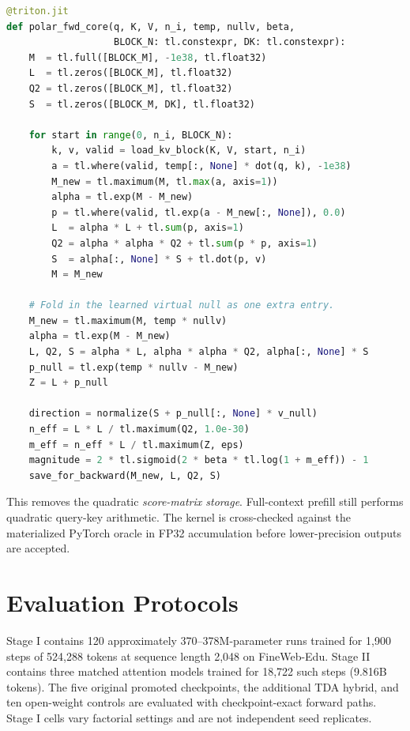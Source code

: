 \begin{lstlisting}[language=Python,caption={Schematic core of the block-streamed Triton forward pass.},label={lst:polar_triton}]
@triton.jit
def polar_fwd_core(q, K, V, n_i, temp, nullv, beta,
                   BLOCK_N: tl.constexpr, DK: tl.constexpr):
    M  = tl.full([BLOCK_M], -1e38, tl.float32)
    L  = tl.zeros([BLOCK_M], tl.float32)
    Q2 = tl.zeros([BLOCK_M], tl.float32)
    S  = tl.zeros([BLOCK_M, DK], tl.float32)

    for start in range(0, n_i, BLOCK_N):
        k, v, valid = load_kv_block(K, V, start, n_i)
        a = tl.where(valid, temp[:, None] * dot(q, k), -1e38)
        M_new = tl.maximum(M, tl.max(a, axis=1))
        alpha = tl.exp(M - M_new)
        p = tl.where(valid, tl.exp(a - M_new[:, None]), 0.0)
        L  = alpha * L + tl.sum(p, axis=1)
        Q2 = alpha * alpha * Q2 + tl.sum(p * p, axis=1)
        S  = alpha[:, None] * S + tl.dot(p, v)
        M = M_new

    # Fold in the learned virtual null as one extra entry.
    M_new = tl.maximum(M, temp * nullv)
    alpha = tl.exp(M - M_new)
    L, Q2, S = alpha * L, alpha * alpha * Q2, alpha[:, None] * S
    p_null = tl.exp(temp * nullv - M_new)
    Z = L + p_null

    direction = normalize(S + p_null[:, None] * v_null)
    n_eff = L * L / tl.maximum(Q2, 1.0e-30)
    m_eff = n_eff * L / tl.maximum(Z, eps)
    magnitude = 2 * tl.sigmoid(2 * beta * tl.log(1 + m_eff)) - 1
    save_for_backward(M_new, L, Q2, S)
\end{lstlisting}

This removes the quadratic \emph{score-matrix storage}.  Full-context prefill still performs quadratic query-key arithmetic. The kernel is cross-checked against the materialized PyTorch oracle in FP32 accumulation before lower-precision outputs are accepted.

\section{Evaluation Protocols}
\label{appendix:protocol}

Stage I contains 120 approximately 370--378M-parameter runs trained for 1,900 steps of 524,288 tokens at sequence length 2,048 on FineWeb-Edu. Stage II contains three matched attention models trained for 18,722 such steps (9.816B tokens). The five original promoted checkpoints, the additional TDA hybrid, and ten open-weight controls are evaluated with checkpoint-exact forward paths. Stage I cells vary factorial settings and are not independent seed replicates.

